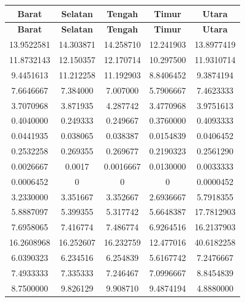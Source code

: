 \begin{longtable}{|c|c|c|c|c|}

    \hline
    \textbf{Barat} & \textbf{Selatan} & \textbf{Tengah} & \textbf{Timur} & \textbf{Utara} \\
    \hline
    \endfirsthead

    \hline
    \textbf{Barat} & \textbf{Selatan} & \textbf{Tengah} & \textbf{Timur} & \textbf{Utara} \\
    \hline
    \endhead

    \hline
    \endfoot

    \hline
    \endlastfoot

    13.9522581 & 14.303871 & 14.258710 & 12.241903 & 13.8977419 \\ \hline
    11.8732143 & 12.150357 & 12.170714 & 10.297500 & 11.9310714 \\ \hline
    9.4451613  & 11.212258 & 11.192903 & 8.8406452 & 9.3874194  \\ \hline
    7.6646667  & 7.384000  & 7.007000  & 5.7906667 & 7.4623333  \\ \hline
    3.7070968  & 3.871935  & 4.287742  & 3.4770968 & 3.9751613  \\ \hline
    0.4040000  & 0.249333  & 0.249667  & 0.3760000 & 0.4093333  \\ \hline
    0.0441935  & 0.038065  & 0.038387  & 0.0154839 & 0.0406452  \\ \hline
    0.2532258  & 0.269355  & 0.269677  & 0.2190323 & 0.2561290  \\ \hline
    0.0026667  & 0.0017    & 0.0016667 & 0.0130000 & 0.0033333  \\ \hline
    0.0006452 & 0 & 0 & 0 & 0.0000452 \\ \hline
    3.2330000 & 3.351667 & 3.352667 & 2.6936667 & 5.7918355 \\ \hline
    5.8887097 & 5.399355 & 5.317742 & 5.6648387 & 17.7812903 \\ \hline
    7.6958065 & 7.416774 & 7.486774 & 6.9264516 & 16.2137903 \\ \hline
    16.2608968 & 16.252607 & 16.232759 & 12.477016 & 40.6182258 \\ \hline
    6.0390323 & 6.234516 & 6.254839 & 5.6167742 & 7.2476667 \\ \hline
    7.4933333 & 7.335333 & 7.246467 & 7.0996667 & 8.8454839 \\ \hline
    8.7500000 & 9.826129 & 9.908710 & 9.4874194 & 4.8880000 \\ \hline

\end{longtable}
